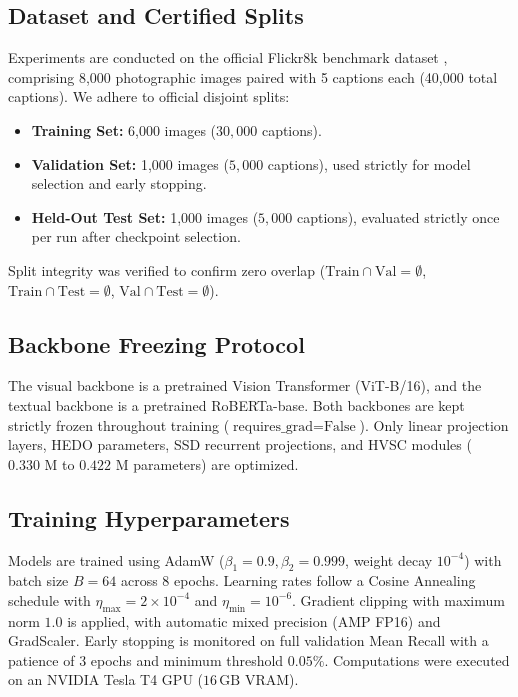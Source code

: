 \documentclass[journal]{IEEEtran}
\begin{document}
\subsection{Dataset and Certified Splits}
Experiments are conducted on the official Flickr8k benchmark dataset \cite{young2014image}, comprising 8,000 photographic images paired with 5 captions each (40,000 total captions). We adhere to official disjoint splits:
\begin{itemize}
    \item \textbf{Training Set:} 6,000 images ($30{,}000$ captions).
    \item \textbf{Validation Set:} 1,000 images ($5{,}000$ captions), used strictly for model selection and early stopping.
    \item \textbf{Held-Out Test Set:} 1,000 images ($5{,}000$ captions), evaluated strictly once per run after checkpoint selection.
\end{itemize}
Split integrity was verified to confirm zero overlap ($\text{Train} \cap \text{Val} = \emptyset$, $\text{Train} \cap \text{Test} = \emptyset$, $\text{Val} \cap \text{Test} = \emptyset$).

\subsection{Backbone Freezing Protocol}
The visual backbone is a pretrained Vision Transformer (ViT-B/16), and the textual backbone is a pretrained RoBERTa-base. Both backbones are kept strictly frozen throughout training ($\text{requires\_grad} = \text{False}$). Only linear projection layers, HEDO parameters, SSD recurrent projections, and HVSC modules ($0.330\text{ M}$ to $0.422\text{ M}$ parameters) are optimized.

\subsection{Training Hyperparameters}
Models are trained using AdamW ($\beta_1 = 0.9, \beta_2 = 0.999$, weight decay $10^{-4}$) with batch size $B=64$ across 8 epochs. Learning rates follow a Cosine Annealing schedule with $\eta_{\text{max}} = 2 \times 10^{-4}$ and $\eta_{\text{min}} = 10^{-6}$. Gradient clipping with maximum norm $1.0$ is applied, with automatic mixed precision (AMP FP16) and GradScaler. Early stopping is monitored on full validation Mean Recall with a patience of 3 epochs and minimum threshold $0.05\%$. Computations were executed on an NVIDIA Tesla T4 GPU ($16\,\text{GB}$ VRAM).
\end{document}

